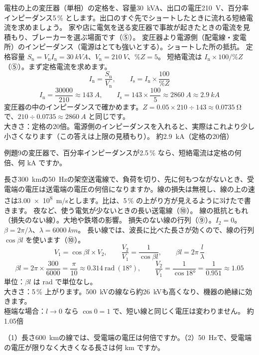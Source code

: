 \label{ph:電-13:ex9}
\begin{phreidai}[変圧器の出口でショートしたら]
電柱の上の変圧器（単相）の定格を、容量\qty{30}{kVA}、出口の電圧\qty{210}{V}、百分率インピーダンス5\,\% とします。出口のすぐ先でショートしたときに流れる短絡電流を求めましょう。
\phbamen
家や店に電気を送る変圧器で事故が起きたときの電流を見積もり、ブレーカーを選ぶ場面です（⑤）。
\phmushi
変圧器より電源側（配電線・変電所）のインピーダンス（電源はとても強いとする）。ショートした所の抵抗。
\phzu
定格容量 $S_{\mathrm n}=V_{\mathrm n}I_{\mathrm n}=\qty{30}{kVA}$、$V_{\mathrm n}=\qty{210}{V}$、$\%Z=5$。
\phriyu
短絡電流は $I_{\mathrm n}\times100/\%Z$（⑤）。まず定格電流を求めます。
\phtateru
\[I_{\mathrm n}=\frac{S_{\mathrm n}}{V_{\mathrm n}},\qquad I_{\mathrm s}=I_{\mathrm n}\times\frac{100}{\%Z}\]
\phtoku
\[I_{\mathrm n}=\frac{30000}{210}\approx\qty{143}{A},\qquad I_{\mathrm s}=143\times\frac{100}{5}\approx\qty{2860}{A}\approx\qty{2.9}{kA}\]
\phtashikame
変圧器の中のインピーダンスで確かめます。$Z=0.05\times210\div143\approx\qty{0.0735}{\ohm}$ で、$210\div0.0735\approx\qty{2860}{A}$ と同じです。\\
大きさ：定格の20倍。電源側のインピーダンスを入れると、実際はこれより少し小さくなります（この答えは上限の見積もり）。
\kotae 約\qty{2.9}{kA}（定格の20倍）
\end{phreidai}
\begin{jibun}
例題9の変圧器で、百分率インピーダンスが2.5\,\% なら、短絡電流は定格の何倍、何 kA ですか。
\end{jibun}

\label{ph:電-13:ex10}
\begin{phreidai}
長さ\qty{300}{km}の\qty{50}{Hz}の架空送電線で、負荷を切り、先に何もつながないとき、受電端の電圧は送電端の電圧の何倍になりますか。線の損失は無視し、線の上の速さは\qty{3.00e8}{m/s}とします。比は、5\,\% の上がり方が見えるように3けたで書きます。
\phbamen
夜など、使う電気が少ないときの長い送電線（⑩）。
\phmushi
線の抵抗ともれ（損失のない線）。大地や鉄塔の影響。
\phzu
損失のない線の行列（⑨）。$I_2=0$。$\beta=2\pi/\lambda$、$\lambda=\qty{6000}{km}$。
\phriyu
長い線では、波長に比べた長さが効くので、線の行列 $\cos\beta l$ を使います（⑩）。
\phtateru
\[V_1=\cos\beta l\times V_2,\qquad\frac{V_2}{V_1}=\frac{1}{\cos\beta l},\qquad\beta l=2\pi\,\frac{l}{\lambda}\]
\phtoku
\[\beta l=2\pi\times\frac{300}{6000}=\frac{\pi}{10}\approx0.314\ \text{rad}\ (18°),\qquad\frac{V_2}{V_1}=\frac{1}{\cos18°}=\frac{1}{0.951}\approx1.05\]
\phtashikame
単位：$\beta l$ は rad で単位なし。\\
大きさ：5\,\% 上がります。\qty{500}{kV}の線なら約\qty{26}{kV}も高くなり、機器の絶縁に効きます。\\
極端な場合：$l\to0$ なら $\cos0=1$ で、短い線と同じく電圧は変わりません。
\kotae 約1.05倍
\end{phreidai}
\begin{jibun}
（1）長さ\qty{600}{km}の線では、受電端の電圧は何倍ですか。（2）\qty{50}{Hz}で、受電端の電圧が限りなく大きくなる長さは何 km ですか。
\end{jibun}

